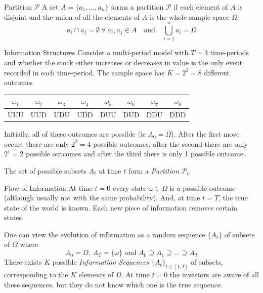 \documentclass[11pt,a4paper]{article}
\begin{document}
  \begin{definition}{Partition $\mathcal{P}$}
    A set $A=\{a_1,\dots,a_n\}$ forms a partition $\mathcal{P}$ if each element of $A$ is disjoint and the union of all the elements of $A$ is the whole sample space $\Omega$.
    \[ a_i\cap a_j=\emptyset\ \forall\ a_i,a_j\in A\quad\text{and}\quad \bigcup\limits_{i=1}^na_i=\Omega \]
  \end{definition}

  \begin{example}{Information Structures}\label{example_information_structures}
    Consider a multi-period model with $T=3$ time-periods and whether the stock either increases or decreases in value is the only event recorded in each time-period. The sample space has $K=2^3=8$ different outcomes
    \begin{center}
      \begin{tabular}{c|c|c|c|c|c|c|c}
        $\omega_1$&$\omega_2$&$\omega_3$&$\omega_4$&$\omega_5$&$\omega_6$&$\omega_7$&$\omega_8$\\\hline
        UUU&UUD&UDU&UDD&DUU&DUD&DDU&DDD\\
      \end{tabular}
    \end{center}
    Initially, all of these outcomes are possible (ie $A_0=\Omega$). After the first move occurs there are only $2^2=4$ possible outcomes, after the second there are only $2^1=2$ possible outcomes and after the third there is only 1 possible outcome.
    \par The set of possible subsets $A_t$ at time $t$ form a \textit{Partition} $\mathcal{P}_t$.
  \end{example}

  \begin{remark}{Flow of Information}
    At time $t=0$ every state $\omega\in\Omega$ is a possible outcome (although usually not with the same probability). And, at time $t=T$, the true state of the world is known. Each new piece of information removes certain states.
    \par One can view the evolution of information as a random sequence $\{A_t\}$ of subsets of $\Omega$ where
    \[ A_0=\Omega,\ A_T=\{\omega\}\text{ and }A_0\supseteq A_1\supseteq\dots\supseteq A_T \]
    There exists $K$ possible \textit{Information Sequences} $\{A_t\}_{t\in[1,T]}$ of subsets, corresponding to the $K$ elements of $\Omega$. At time $t=0$ the investors are aware of all these sequences, but they do not know which one is the true sequence.
  \end{remark}
\end{document}
